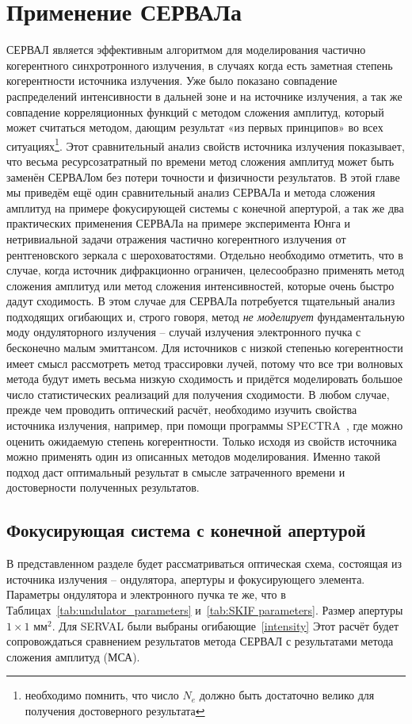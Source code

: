 \chapter{Применение СЕРВАЛа} \label{chapt3}
СЕРВАЛ является эффективным алгоритмом для моделирования частично когерентного синхротронного излучения, в случаях когда есть заметная степень когерентности источника излучения. Уже было показано совпадение распределений интенсивности в дальней зоне и на источнике излучения, а так же совпадение корреляционных функций с методом сложения амплитуд, который может считаться методом, дающим результат «из первых принципов» во всех ситуациях\footnote{необходимо помнить, что число $N_e$ должно быть достаточно велико для получения достоверного результата}. Этот сравнительный анализ свойств источника излучения показывает, что весьма ресурсозатратный по времени метод сложения амплитуд может быть заменён СЕРВАЛом без потери точности и физичности результатов. В этой главе мы приведём ещё один сравнительный анализ СЕРВАЛа и метода сложения амплитуд на примере фокусирующей системы с конечной апертурой, а так же два практических применения СЕРВАЛа на примере эксперимента Юнга и нетривиальной задачи отражения частично когерентного излучения от рентгеновского зеркала с шероховатостями. 
Отдельно необходимо отметить, что в случае, когда источник дифракционно ограничен, целесообразно применять метод сложения амплитуд или метод сложения интенсивностей, которые очень быстро дадут сходимость. В этом случае для СЕРВАЛа потребуется тщательный анализ подходящих огибающих и, строго говоря, метод \textit{не моделирует} фундаментальную моду ондуляторного излучения -- случай излучения электронного пучка с бесконечно малым эмиттансом. Для источников с низкой степенью когерентности имеет смысл рассмотреть метод трассировки лучей, потому что все три волновых метода будут иметь весьма низкую сходимость и придётся моделировать большое число статистических реализаций для получения сходимости. В любом случае, прежде чем проводить оптический расчёт, необходимо изучить свойства источника излучения, например, при помощи программы SPECTRA~\cite{tanaka_spectra_2001}, где можно оценить ожидаемую степень когерентности. Только исходя из свойств источника можно применять один из описанных методов моделирования. Именно такой подход даст оптимальный результат в смысле затраченного времени и достоверности полученных результатов. 

\section{Фокусирующая система с конечной апертурой}\label{section:focusing_system_with_aperture}
В представленном разделе будет рассматриваться оптическая схема, состоящая из источника излучения -- ондулятора, апертуры и фокусирующего элемента. Параметры ондулятора и электронного пучка те же, что в Таблицах~\ref{tab:undulator_parameters} и~\ref{tab:SKIF parameters}. Размер апертуры $1 \times 1$ мм$^2$. Для SERVAL были выбраны огибающие~\ref{intensity} Этот расчёт будет сопровождаться сравнением результатов метода СЕРВАЛ с результатами метода сложения амплитуд (МСА).

